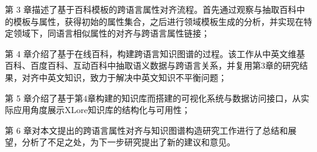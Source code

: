 第 3 章描述了基于百科模板的跨语言属性对齐流程。首先通过观察与抽取百科中的模板与属性，获得初始的属性集合，之后进行领域模板生成的分析，并实现在特定领域下，同语言相似属性的对齐与跨语言属性链接；

第 4 章介绍了基于在线百科，构建跨语言知识图谱的过程。该工作从中英文维基百科、百度百科、互动百科中抽取语义数据与跨语言关系，并复用第3章的研究结果，对齐中英文知识，致力于解决中英文知识不平衡问题；

第 5 章介绍了基于第4章构建的知识库而搭建的可视化系统与数据访问接口，从实际应用角度展示XLore知识库的结构化与可用性；

第 6 章对本文提出的跨语言属性对齐与知识图谱构造研究工作进行了总结和展望，分析了不足之处，为下一步研究提出了新的建议和意见。
 

